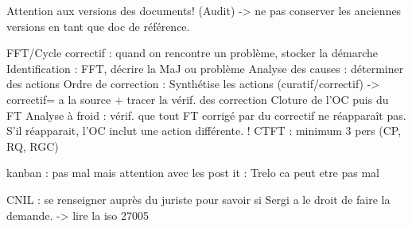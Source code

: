 \documentclass [a4paper] {article}
\begin{document}
Attention aux versions des documents! (Audit) -> ne pas conserver les anciennes versions en tant que doc de référence.



FFT/Cycle correctif : quand on rencontre un problème, stocker la démarche
Identification : FFT, décrire la MaJ ou problème
Analyse des causes : déterminer des actions
Ordre de correction : Synthétise les actions (curatif/correctif) -> correctif= a la source + tracer la vérif. des correction
Cloture de l'OC puis du FT
Analyse à froid : vérif. que tout FT corrigé par du correctif ne réapparaît pas.
S'il réapparait, l'OC inclut une action différente. !
CTFT : minimum 3 pers (CP, RQ, RGC)

kanban : pas mal mais attention avec les post it : Trelo ca peut etre pas mal


CNIL : se renseigner auprès du juriste pour savoir si Sergi a le droit de faire la demande.  ->  lire la iso 27005 
\end{document}
